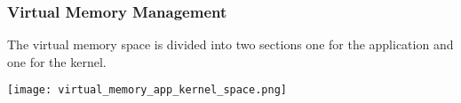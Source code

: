 







\subsubsection{Virtual Memory Management}
The virtual memory space is divided into two sections one for the application and one for the kernel.
\begin{center}
    \texttt{[image: virtual\_memory\_app\_kernel\_space.png]}
\end{center}


